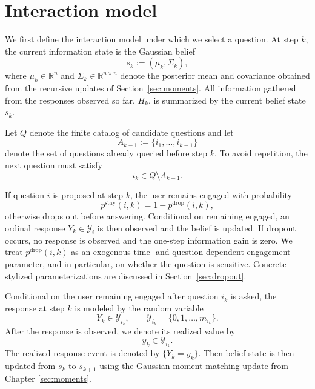 \documentclass{article}
\begin{document}
\section{Interaction model}\label{sec:interaction_model}

We first define the interaction model under which we select a question.
At step $k$, the current information state is the Gaussian belief
\begin{equation*}
s_k := (\mu_k,\Sigma_k),
\end{equation*}
where $\mu_k \in \mathbb{R}^n$ and $\Sigma_k \in \mathbb{R}^{n\times n}$
denote the posterior mean and covariance obtained from the recursive updates of
Section~\ref{sec:moments}. All information gathered from the responses observed
so far, $H_k$, is summarized by the current belief state $s_k$.

Let $Q$ denote the finite catalog of candidate questions and let
\begin{equation*}
A_{k-1} := \{i_1,\dots,i_{k-1}\}
\end{equation*}
denote the set of questions already queried before step $k$. To avoid repetition,
the next question must satisfy
\begin{equation*}
i_k \in Q \setminus A_{k-1}.
\end{equation*}

If question $i$ is proposed at step $k$, the user remains engaged with probability
\begin{equation*}
p^{ \text{stay}}(i,k)=1-p^{ \text{drop}}(i,k),
\end{equation*}
otherwise drops out before answering. Conditional on remaining engaged, an ordinal
response $Y_k\in\mathcal Y_i$ is then observed and the belief is updated.
If dropout occurs, no response is observed and the one-step information gain is zero. We treat $p^{ \text{drop}}(i,k)$ as an
exogenous time- and question-dependent engagement parameter, and in particular, on whether the question is sensitive. Concrete
stylized parameterizations are discussed in Section~\ref{sec:dropout}.

Conditional on the user remaining engaged after question $i_k$ is asked, the response
at step $k$ is modeled by the random variable
\begin{equation*}
Y_k \in \mathcal Y_{i_k},
\qquad
\mathcal Y_{i_k}=\{0,1,\dots,m_{i_k}\}.
\end{equation*}
After the response is observed, we denote its realized value by
\begin{equation*}
y_k \in \mathcal Y_{i_k}.
\end{equation*}
The realized response event is denoted by $\{Y_k=y_k\}$. Then belief state is then updated
from $s_k$ to $s_{k+1}$ using the Gaussian moment-matching update from Chapter \ref{sec:moments}.
\end{document}
